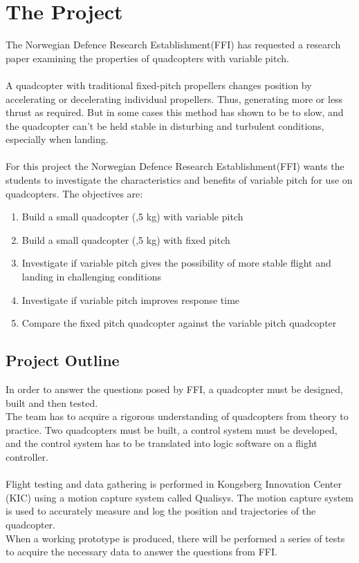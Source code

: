 \section{The Project}

The Norwegian Defence Research Establishment(FFI) has requested a research paper examining the properties of quadcopters with variable pitch. \\
\\
A quadcopter with traditional fixed-pitch propellers changes position by accelerating or decelerating individual propellers. Thus, generating more or less thrust as required.
But in some cases this method has shown to be to slow, and the quadcopter can't be held stable in disturbing and turbulent conditions, especially when landing. \\
\\
For this project the Norwegian Defence Research Establishment(FFI) wants the students to investigate the characteristics and benefits of variable pitch for use on quadcopters. The objectives are:
\begin{enumerate}
\item Build a small quadcopter (,5 kg) with variable pitch
\item Build a small quadcopter (,5 kg) with fixed pitch
\item Investigate if variable pitch gives the possibility of more stable flight and landing in challenging conditions
\item Investigate if variable pitch improves response time
\item Compare the fixed pitch quadcopter against the variable pitch quadcopter
\end{enumerate}

\subsection{Project Outline} 

In order to answer the questions posed by FFI, a quadcopter must be designed, built and then tested.
\\
The team has to acquire a rigorous understanding of quadcopters from theory to practice. Two quadcopters must be built, a control system must be developed, and the control system has to be translated into logic software on a flight controller.\\
\\
Flight testing and data gathering is performed in Kongsberg Innovation Center (KIC) using a motion capture system called Qualisys. The motion capture system is used to accurately measure and log the position and trajectories of the quadcopter. 
\\
When a working prototype is produced, there will be performed a series of tests to acquire the necessary data to answer the questions from FFI.

